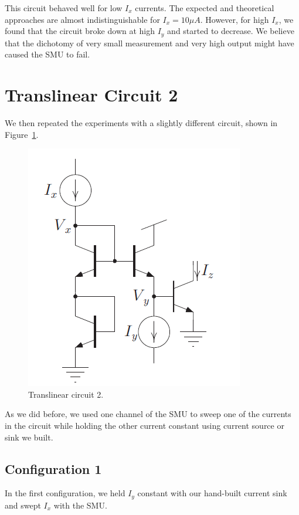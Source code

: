 \documentclass{article}
\begin{document}
This circuit behaved well for low $I_x$ currents.  The expected and theoretical approaches are almost indistinguishable for $I_x = 10 \mu A$.  However, for high $I_x$, we found that the circuit broke down at high $I_y$ and started to decrease.  We believe that the dichotomy of very small measurement and very high output might have caused the SMU to fail.

\section*{Translinear Circuit 2}

We then repeated the experiments with a slightly different circuit, shown in Figure~\ref{fig:tl2}.

\begin{figure}[H]
\begin{center}
\includegraphics[scale=.5]{tl2.png}
\caption{Translinear circuit 2.}
\label{fig:tl2}
\end{center}
\end{figure}

As we did before, we used one channel of the SMU to sweep one of the currents in the circuit while holding the other current constant using current source or sink we built.

\subsection*{Configuration 1}

In the first configuration, we held $I_y$ constant with our hand-built current sink and swept $I_x$ with the SMU.  
\end{document}
